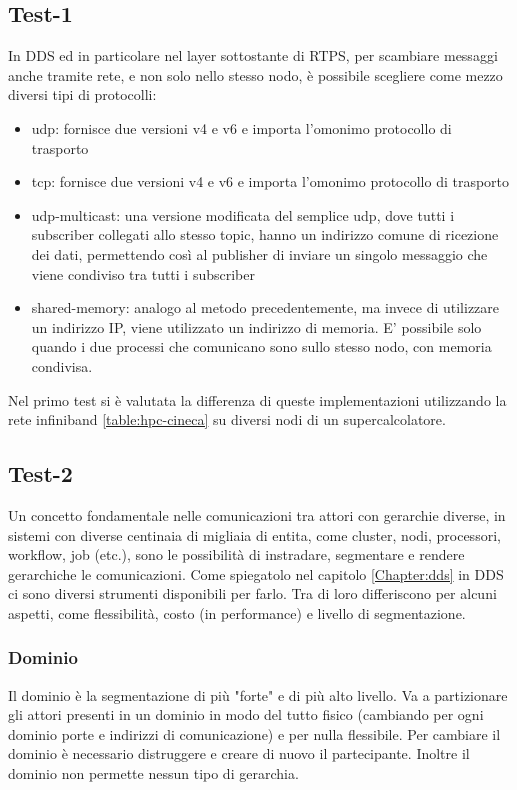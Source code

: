 \subsection{Test-1}
In DDS ed in particolare nel layer sottostante di RTPS, per scambiare messaggi anche tramite rete, e non solo nello stesso nodo, è possibile scegliere come mezzo diversi tipi di protocolli:

\begin{itemize}
    \item udp: fornisce due versioni v4 e v6 e importa l'omonimo protocollo di trasporto
    \item tcp: fornisce due versioni v4 e v6 e importa l'omonimo protocollo di trasporto
    \item udp-multicast: una versione modificata del semplice udp, dove tutti i subscriber collegati allo stesso topic, hanno un indirizzo comune di ricezione dei dati, permettendo così al publisher di inviare un singolo messaggio che viene condiviso tra tutti i subscriber  %
    \item shared-memory: analogo al metodo precedentemente, ma invece di utilizzare un indirizzo IP, viene utilizzato un indirizzo di memoria. E' possibile solo quando i due processi che comunicano sono sullo stesso nodo, con memoria condivisa.
\end{itemize}

Nel primo test si è valutata la differenza di queste implementazioni utilizzando la rete infiniband \ref{table:hpc-cineca} su diversi nodi di un supercalcolatore. 

\subsection{Test-2}
Un concetto fondamentale nelle comunicazioni tra attori con gerarchie diverse, in sistemi con diverse centinaia di migliaia di entita, come cluster, nodi, processori, workflow, job (etc.), sono le possibilità di instradare, segmentare e rendere gerarchiche le comunicazioni. Come spiegatolo nel capitolo \ref{Chapter:dds} in DDS ci sono diversi strumenti disponibili per farlo. Tra di loro differiscono per alcuni aspetti, come flessibilità, costo (in performance) e livello di segmentazione.

\subsubsection*{Dominio} 
Il dominio è la segmentazione di più "forte" e di più alto livello. Va a partizionare gli attori presenti in un dominio in modo del tutto fisico (cambiando per ogni dominio porte e indirizzi di comunicazione) e per nulla flessibile. Per cambiare il dominio è necessario distruggere e creare di nuovo il partecipante. Inoltre il dominio non permette nessun tipo di gerarchia.
    
